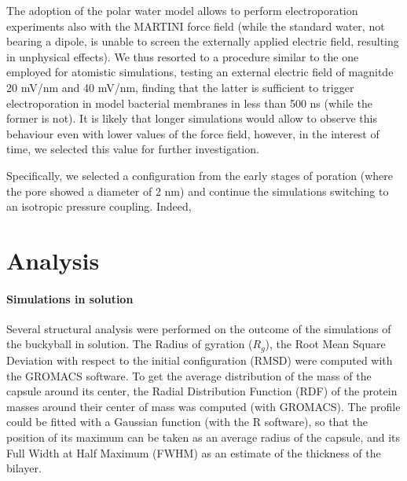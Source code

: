 The adoption of the polar water model allows to perform electroporation experiments also with the MARTINI force field (while the standard water, not bearing a dipole, is unable to screen the externally applied electric field, resulting in unphysical effects).
%
We thus resorted to a procedure similar to the one employed for atomistic simulations, testing an external electric field of magnitde 20 mV/nm and 40 mV/nm, finding that the latter is sufficient to trigger electroporation in model bacterial membranes in less than 500 ns (while the former is not). It is likely that longer simulations would allow to observe this behaviour even with lower values of the force field, however, in the interest of time, we selected this value for further investigation.

Specifically, we selected a configuration from the early stages of poration (where the pore showed a diameter of 2 nm) and continue the simulations switching to an isotropic pressure coupling. Indeed, 




\section{Analysis}

\paragraph{Simulations in solution}
Several structural analysis were performed on the outcome of the simulations of the buckyball in solution. The Radius of gyration ($R_g$), the Root Mean Square Deviation with respect to the initial configuration (RMSD) were computed with the GROMACS software.
%
To get the average distribution of the mass of the capsule around its center, the Radial Distribution Function (RDF) of the protein masses around their center of mass was computed (with GROMACS). The profile could be fitted with a Gaussian function (with the R \cite{??} software), so that the position of its maximum can be taken as an average radius of the capsule, and its Full Width at Half Maximum (FWHM) as an estimate of the thickness of the bilayer.

